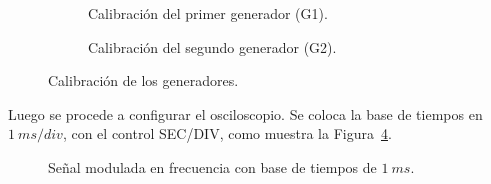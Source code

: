      \begin{figure}[H]
        \centering
        \begin{subfigure}[H]{0.48\textwidth}
          \caption{Calibración del primer generador (G1).}
          \label{fig:Exp6CalibracionG1}
        \end{subfigure}
        \hfill 
        \begin{subfigure}[H]{0.48\textwidth}
          \caption{Calibración del segundo generador (G2).}
          \label{fig:Exp6CalibracionG2}
        \end{subfigure}
        \caption{Calibración de los generadores.}
        \label{fig:Exp6CalibracionGeneradores}
      \end{figure}

    Luego se procede a configurar el osciloscopio. Se coloca la base de tiempos  
    en $1~ms/div$, con el control SEC/DIV, como muestra la Figura~\ref{fig:Exp6SeñalFM1ms}.

      \begin{figure}[H]
        \centering
          \caption{Señal modulada en frecuencia con base de tiempos de $1~ms$.}
          \label{fig:Exp6SeñalFM1ms}
      \end{figure}

